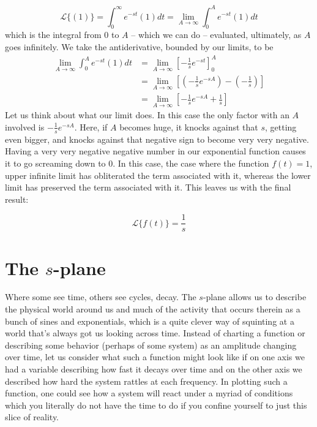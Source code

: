 \documentclass[11pt]{book}
\begin{document}
\begin{equation}
	\mathcal{L}\{(1)\} = \int_0^{\infty}e^{-st}(1)dt = \lim_{A\rightarrow \infty}\int_0^{A}e^{-st}(1)dt 
\end{equation}
which is the integral from $0$ to $A$ -- which we can do -- evaluated, ultimately, as $A$ goes infinitely. We take the antiderivative, bounded by our limits, to be
\begin{align}
	\lim_{A\rightarrow \infty}\int_0^{A}e^{-st}(1)dt &= \lim_{A\rightarrow \infty}\left[-\frac{1}{s}e^{-st}\right]_0^A \\
	&= \lim_{A\rightarrow \infty}\left[\left(-\frac{1}{s}e^{-sA}\right)-\left(-\frac{1}{s}\right)\right] \\
	&= \lim_{A\rightarrow \infty}\left[-\frac{1}{s}e^{-sA}+\frac{1}{s}\right]
\end{align}
Let us think about what our limit does. In this case the only factor with an $A$ involved is $-\frac{1}{s}e^{-sA}$. Here, if $A$ becomes huge, it knocks against that $s$, getting even bigger, and knocks against that negative sign to become very very negative. Having a very very negative negative number in our exponential function causes it to go screaming down to 0. In this case, the case where the function $f(t) = 1$, upper infinite limit has obliterated the term associated with it, whereas the lower limit has preserved the term associated with it. This leaves us with the final result:

\begin{equation}
	\mathcal{L}\{f(t)\} = \frac{1}{s}
\end{equation}

\section{The $s$-plane}
Where some see time, others see cycles, decay. The $s$-plane allows us to describe the physical world around us and much of the activity that occurs therein as a bunch of sines and exponentials, which is a quite clever way of squinting at a world that's always got us looking across time. Instead of charting a function or describing some behavior (perhaps of some system) as an amplitude changing over time, let us consider what such a function might look like if on one axis we had a variable describing how fast it decays over time and on the other axis we described how hard the system rattles at each frequency. In plotting such a function, one could see how a system will react under a myriad of conditions which you literally do not have the time to do if you confine yourself to just this slice of reality.
\end{document}
